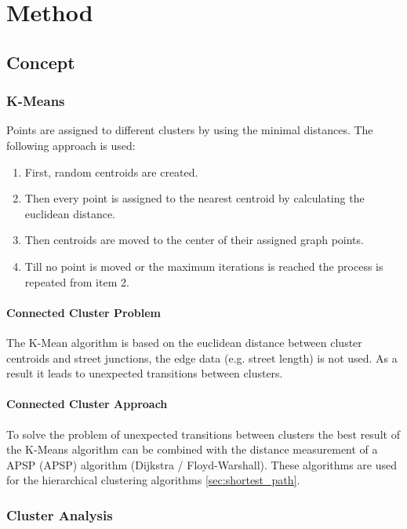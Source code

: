 \chapter{Method}

\section{Concept}

\subsection{K-Means}
Points are assigned to different clusters by using the minimal distances. The following approach is used:

\begin{enumerate}
    \item First, random centroids are created.
    \item Then every point is assigned to the nearest centroid by calculating the euclidean distance.
    \item Then centroids are moved to the center of their assigned graph points.
    \item Till no point is moved or the maximum iterations is reached the process is repeated from item 2.
\end{enumerate}

\subsubsection{Connected Cluster Problem} \label{sec:kmenasProblem}
The K-Mean algorithm is based on the euclidean distance between cluster centroids and street junctions, the edge data (e.g. street length) is not used. As a result it leads to unexpected transitions between clusters.

\subsubsection{Connected Cluster Approach} \label{sec:connected_cluster_approach}
To solve the problem of unexpected transitions between clusters the best result of the K-Means algorithm can be combined with the distance measurement of a \acrlong{APSP} (\acrshort{APSP}) algorithm (Dijkstra / Floyd-Warshall). These algorithms are used for the hierarchical clustering algorithms \ref{sec:shortest_path}. 

\subsection{Cluster Analysis}


